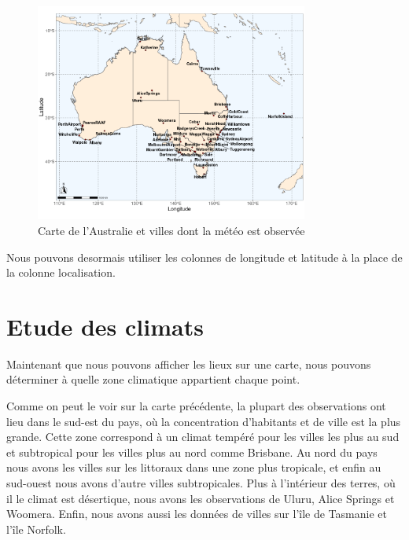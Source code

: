 \documentclass{article}
\begin{document}
\begin{figure}[H]
    \centering
    \includegraphics[width=0.8\textwidth]{Images/Cartographie/Australia_full_map.png}
    \caption{Carte de l'Australie et villes dont la météo est observée}
\end{figure}

Nous pouvons desormais utiliser les colonnes de longitude et latitude à la place de la colonne localisation. 

\section{Etude des climats}

Maintenant que nous pouvons afficher les lieux sur une carte, nous pouvons déterminer à quelle zone climatique appartient chaque point.

Comme on peut le voir sur la carte précédente, la plupart des observations ont lieu dans le sud-est du pays, où la concentration d'habitants et de ville est la plus grande. Cette zone correspond à un climat tempéré pour les villes les plus au sud et subtropical pour les villes plus au nord comme Brisbane. Au nord du pays nous avons les villes sur les littoraux dans une zone plus tropicale, et enfin au sud-ouest nous avons d'autre villes subtropicales. Plus à l'intérieur des terres, où il le climat est désertique, nous avons les observations de Uluru, Alice Springs et Woomera. Enfin, nous avons aussi les données de villes sur l'île de Tasmanie et l'île Norfolk. 
\end{document}
